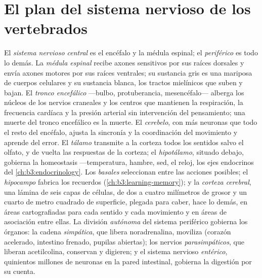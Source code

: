 \section{El plan del sistema nervioso de los vertebrados}

\begin{definition}\label{def:b3:nervous-systems:plan}
El \emph{sistema nervioso central} es el encéfalo y la médula espinal;
el \emph{periférico} es todo lo demás. La \emph{médula espinal} recibe
axones sensitivos por sus raíces dorsales y envía axones motores por
sus raíces ventrales; su sustancia gris es una mariposa de cuerpos
celulares y su sustancia blanca, los tractos mielínicos que suben y
bajan. El \emph{tronco encefálico} ---bulbo, protuberancia,
mesencéfalo--- alberga los núcleos de los nervios craneales y los
centros que mantienen la respiración, la frecuencia cardíaca y la
presión arterial sin intervención del pensamiento; una muerte del
tronco encefálico es la muerte. El \emph{cerebelo}, con más neuronas
que todo el resto del encéfalo, ajusta la sincronía y la coordinación
del movimiento y aprende del error. El \emph{tálamo} transmite a la
corteza todos los sentidos salvo el olfato, y de vuelta las respuestas
de la corteza; el \emph{hipotálamo}, situado debajo, gobierna la
homeostasis ---temperatura, hambre, sed, el reloj, los ejes endocrinos
del \cref{ch:b3:endocrinology}. Los \emph{ basales} seleccionan
entre las acciones posibles; el \emph{hipocampo} fabrica los recuerdos
(\cref{ch:b3:learning-memory}); y la \emph{corteza cerebral}, una
lámina de seis capas de células, de dos a cuatro milímetros de grosor y
un cuarto de metro cuadrado de superficie, plegada para caber, hace lo
demás, en áreas cartografiadas para cada sentido y cada movimiento y en
áreas de asociación entre ellas. La división \emph{autónoma} del
sistema periférico gobierna los órganos: la cadena \emph{simpática},
que libera noradrenalina, moviliza (corazón acelerado, intestino
frenado, pupilas abiertas); los nervios \emph{parasimpáticos}, que
liberan acetilcolina, conservan y digieren; y el sistema nervioso
\emph{entérico}, quinientos millones de neuronas en la pared
intestinal, gobierna la digestión por su cuenta.
\end{definition}

